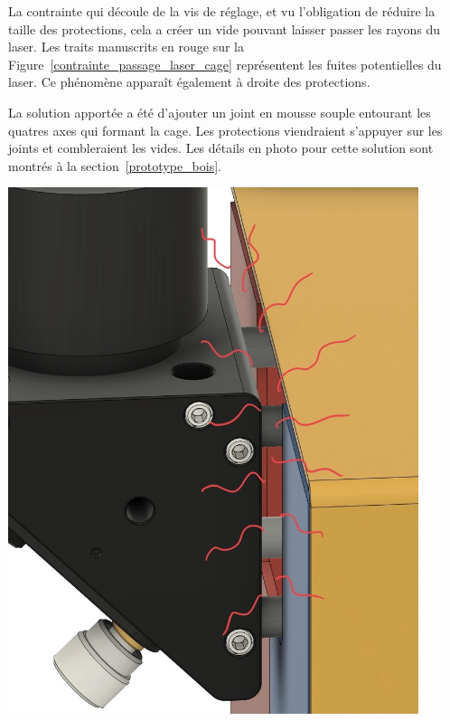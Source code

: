 \begin{minipage}[c]{0.5\textwidth}
    La contrainte qui découle de la vis de réglage, et vu l'obligation de réduire la taille des protections, cela a créer un vide pouvant laisser passer les rayons du laser. Les traits manuscrits en rouge sur la Figure~\ref{contrainte_passage_laser_cage} représentent les fuites potentielles du laser. Ce phénomène apparaît également à droite des protections.

    La solution apportée a été d'ajouter un joint en mousse souple entourant les quatres axes qui formant la cage. Les protections viendraient s'appuyer sur les joints et combleraient les vides. Les détails en photo pour cette solution sont montrés à la section~\ref{prototype_bois}.
\end{minipage}\hfill
\begin{minipage}[c]{0.48\textwidth}
    \begin{center}
        \includegraphics[width=0.9\textwidth]{assets/figures/Protections_laser/Securite_mecanique/Protection_entree_laser/contrainte_passage_laser_cage.jpeg}
    \end{center}
    \label{contrainte_passage_laser_cage}
\end{minipage}

